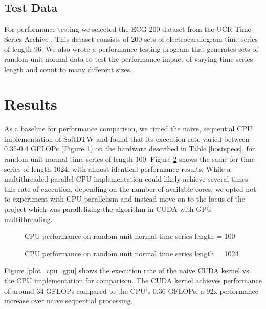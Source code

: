 \documentclass[12pt, letterpaper]{article}
\begin{document}
\subsection{Test Data}

For performance testing we selected the ECG 200 dataset from the UCR Time Series
Archive \cite{dau_ucr_2019}. This dataset consists of 200 sets of
electrocardiogram time series of length 96. We also wrote a performance testing
program that generates sets of random unit normal data to test the performance
impact of varying time series length and count to many different sizes.


\section{Results}
\FloatBarrier

As a baseline for performance comparison, we timed the naive, sequential CPU
implementation of SoftDTW and found that its execution rate varied between
0.35-0.4 GFLOPs (Figure \ref{plot_cpu}) on the hardware described in Table
\ref{hostspecs}, for random unit normal time series of length 100. Figure
\ref{plot_cpu_1024} shows the same for time series of length 1024, with almost
identical performance results. While a multithreaded parallel CPU implementation
could likely achieve several times this rate of execution, depending on the
number of available cores, we opted not to experiment with CPU parallelism and
instead move on to the focus of the project which was parallelizing the
algorithm in CUDA with GPU multithreading.

\begin{figure}[htbp]
    \begin{center}
        \scalebox{0.85}{}
    \end{center}
    \caption{CPU performance on random unit normal time series length = 100}
    \label{plot_cpu}
\end{figure}

\begin{figure}[htbp]
    \begin{center}
        \scalebox{0.85}{}
    \end{center}
    \caption{CPU performance on random unit normal time series length = 1024}
    \label{plot_cpu_1024}
\end{figure}


Figure \ref{plot_cpu_gpu} shows the execution rate of the naive CUDA kernel
vs. the CPU implementation for comparison. The CUDA kernel achieves performance
of around 34 GFLOPs compared to the CPU's 0.36 GFLOPs, a 92x performance
increase over naive sequential processing.
\end{document}
